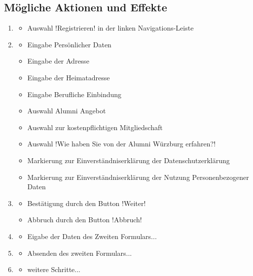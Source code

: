 \documentclass[fontsize=12pt,a4paper]{scrartcl}
\begin{document}
\subsection{Mögliche Aktionen und Effekte}
\begin{enumerate}
	\item 
	\begin{itemize}
		\item Auswahl !Registrieren! in der linken Navigations-Leiste 
	\end{itemize}
	\item 
	\begin{itemize}
		\item Eingabe Persönlicher Daten
		\item Eingabe der Adresse
		\item Eingabe der Heimatadresse
		\item Eingabe Berufliche Einbindung
		\item Auswahl Alumni Angebot
		\item Auswahl zur kostenpflichtigen Mitgliedschaft
		\item Auswahl !Wie haben Sie von der Alumni Würzburg erfahren?!
		\item Markierung zur Einverständniserklärung der Datenschutzerklärung
		\item Markierung zur Einverständniserklärung der Nutzung Personenbezogener Daten
	\end{itemize}
	\item 
	\begin{itemize}
		\item Bestätigung durch den Button !Weiter!
		\item Abbruch durch den Button !Abbruch! 
	\end{itemize}
	\item 
	\begin{itemize}
		\item Eigabe der Daten des Zweiten Formulars...
	\end{itemize}
	\item 
	\begin{itemize}
		\item Absenden des zweiten Formulars...
	\end{itemize}
	\item 
	\begin{itemize}
		\item weitere Schritte...
	\end{itemize}
\end{enumerate}
\end{document}
